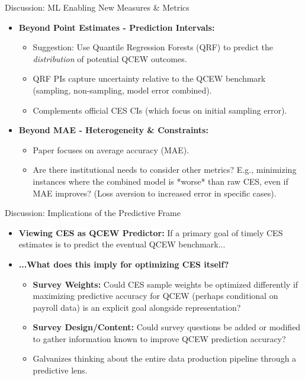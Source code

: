 \documentclass{beamer}
\begin{document}
\begin{frame}{Discussion: ML Enabling New Measures \& Metrics}
    \begin{itemize}
        \item \textbf{Beyond Point Estimates - Prediction Intervals:}
            \begin{itemize}
                \item Suggestion: Use Quantile Regression Forests (QRF) to predict the \textit{distribution} of potential QCEW outcomes.
                \item QRF PIs capture uncertainty relative to the QCEW benchmark (sampling, non-sampling, model error combined).
                \item Complements official CES CIs (which focus on initial sampling error).
            \end{itemize}
        \item \textbf{Beyond MAE - Heterogeneity \& Constraints:}
             \begin{itemize}
                \item Paper focuses on average accuracy (MAE).
                \item Are there institutional needs to consider other metrics? E.g., minimizing instances where the combined model is *worse* than raw CES, even if MAE improves? (Loss aversion to increased error in specific cases).
             \end{itemize}
    \end{itemize}
\end{frame}

\begin{frame}{Discussion: Implications of the Predictive Frame}
    \begin{itemize}
        \item \textbf{Viewing CES as QCEW Predictor:} If a primary goal of timely CES estimates is to predict the eventual QCEW benchmark...
        \item \textbf{...What does this imply for optimizing CES itself?}
            \begin{itemize}
                \item \textbf{Survey Weights:} Could CES sample weights be optimized differently if maximizing predictive accuracy for QCEW (perhaps conditional on payroll data) is an explicit goal alongside representation?
                \item \textbf{Survey Design/Content:} Could survey questions be added or modified to gather information known to improve QCEW prediction accuracy?
                \item Galvanizes thinking about the entire data production pipeline through a predictive lens.
            \end{itemize}
    \end{itemize}
\end{frame}
\end{document}
